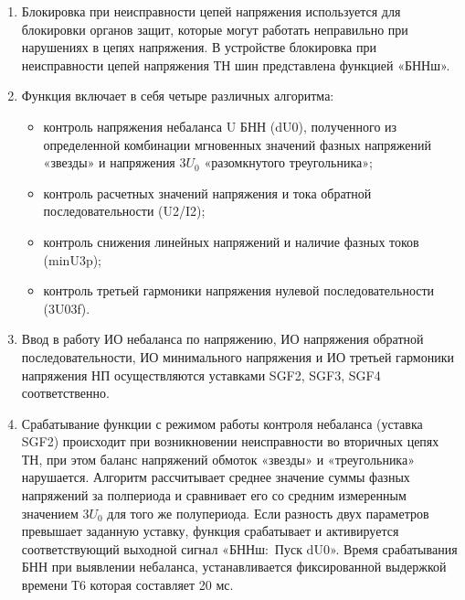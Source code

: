 
\color{black}

\begin{enumerate}

\item
Блокировка при неисправности цепей напряжения используется для блокировки органов защит, которые могут работать неправильно при нарушениях в цепях напряжения. В устройстве блокировка при неисправности цепей напряжения ТН шин представлена функцией «БННш».

\item
Функция включает в себя четыре различных алгоритма:
\begin{itemize}
    \item контроль напряжения небаланса U БНН (dU0), полученного из определенной комбинации мгновенных значений фазных напряжений «звезды» и напряжения $3U_0$ «разомкнутого треугольника»;
    \item контроль расчетных значений напряжения и тока обратной последовательности (U2/I2);
    \item контроль снижения линейных напряжений и наличие фазных токов (minU3p);
    \item контроль третьей гармоники напряжения нулевой последовательности (3U03f).
\end{itemize}

\item
Ввод в работу ИО небаланса по напряжению, ИО напряжения обратной последовательности, ИО минимального напряжения и ИО третьей гармоники напряжения НП осуществляются уставками SGF2, SGF3, SGF4 соответственно.

\item
Срабатывание функции с режимом работы контроля небаланса (уставка SGF2) происходит при возникновении неисправности во вторичных цепях ТН, при этом баланс напряжений обмоток «звезды» и «треугольника» нарушается. Алгоритм рассчитывает среднее значение суммы фазных напряжений за полпериода и сравнивает его со средним измеренным значением $3U_0$ для того же полупериода. Если разность двух параметров превышает заданную уставку, функция срабатывает и активируется соответствующий выходной сигнал «БННш:~Пуск dU0». Время срабатывания БНН при выявлении небаланса, устанавливается фиксированной выдержкой времени Т6 которая составляет 20 мс.


\end{enumerate}
